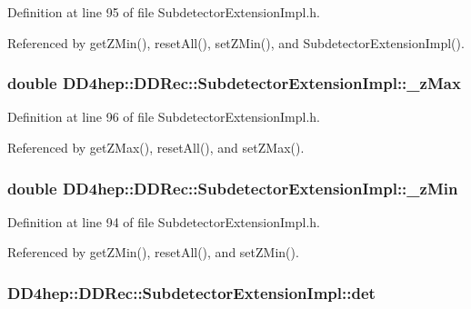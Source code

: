 Definition at line 95 of file SubdetectorExtensionImpl.h.

Referenced by getZMin(), resetAll(), setZMin(), and SubdetectorExtensionImpl().\hypertarget{class_d_d4hep_1_1_d_d_rec_1_1_subdetector_extension_impl_aa8e755cc627d81013fb4e3501fdbe172}{
\subsubsection[{\_\-zMax}]{\setlength{\rightskip}{0pt plus 5cm}double {\bf DD4hep::DDRec::SubdetectorExtensionImpl::\_\-zMax}}}
\label{class_d_d4hep_1_1_d_d_rec_1_1_subdetector_extension_impl_aa8e755cc627d81013fb4e3501fdbe172}


Definition at line 96 of file SubdetectorExtensionImpl.h.

Referenced by getZMax(), resetAll(), and setZMax().\hypertarget{class_d_d4hep_1_1_d_d_rec_1_1_subdetector_extension_impl_a33f8e745fb1bf3a861f69c1f3585c8b9}{
\subsubsection[{\_\-zMin}]{\setlength{\rightskip}{0pt plus 5cm}double {\bf DD4hep::DDRec::SubdetectorExtensionImpl::\_\-zMin}}}
\label{class_d_d4hep_1_1_d_d_rec_1_1_subdetector_extension_impl_a33f8e745fb1bf3a861f69c1f3585c8b9}


Definition at line 94 of file SubdetectorExtensionImpl.h.

Referenced by getZMin(), resetAll(), and setZMin().\hypertarget{class_d_d4hep_1_1_d_d_rec_1_1_subdetector_extension_impl_a5573895361adac8070eb23454538d76e}{
\subsubsection[{det}]{ {\bf DD4hep::DDRec::SubdetectorExtensionImpl::det}}}
\label{class_d_d4hep_1_1_d_d_rec_1_1_subdetector_extension_impl_a5573895361adac8070eb23454538d76e}


